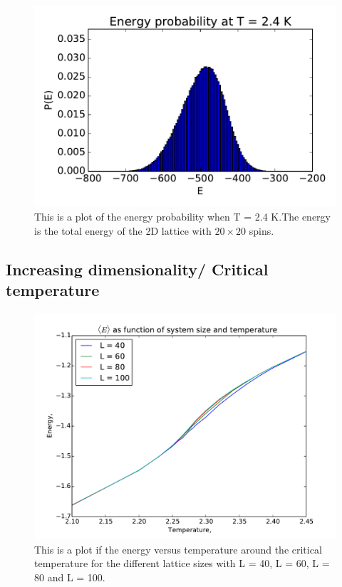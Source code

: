 \begin{figure}[H]
\includegraphics[width=\linewidth]{../results/4d/d_T_2_4probability}\caption{This is a plot of the energy probability when T = 2.4 K.The energy is the total energy of the 2D lattice with $20\times 20$ spins.}\label{fig:probability_T_2.4}
\end{figure}

\subsection{Increasing dimensionality/ Critical temperature}

\begin{figure}[H]
\includegraphics[width=\linewidth]{../results/4e/4e_energy}\caption{This is a plot if the energy versus temperature around the critical temperature for the different lattice sizes with L = 40, L = 60, L = 80 and L = 100.}\label{fig:4e_energy}
\end{figure}

